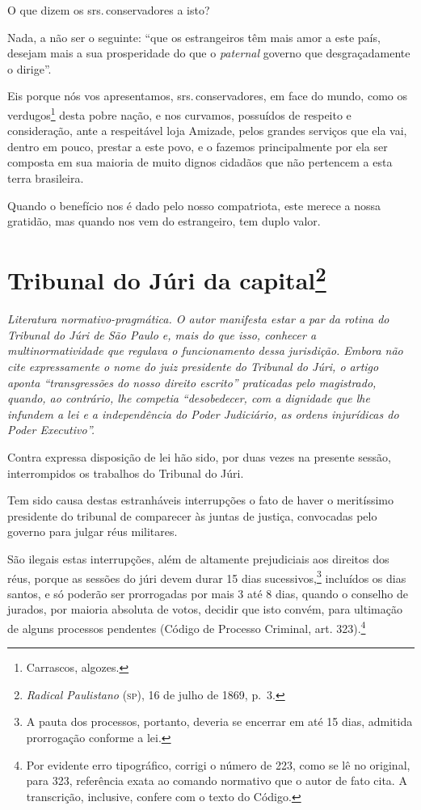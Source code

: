 O que dizem os srs.\,conservadores a isto?

Nada, a não ser o seguinte: ``que os estrangeiros têm mais amor a este
país, desejam mais a sua prosperidade do que o \emph{paternal} governo
que desgraçadamente o dirige''.

Eis porque nós vos apresentamos, srs.\,conservadores, em face do mundo,
como os verdugos\footnote{Carrascos, algozes.} desta pobre nação, e
nos curvamos, possuídos de respeito e consideração, ante a respeitável
loja Amizade, pelos grandes serviços que ela vai, dentro em pouco,
prestar a este povo, e o fazemos principalmente por ela ser composta em
sua maioria de muito dignos cidadãos que não pertencem a esta terra
brasileira.

Quando o benefício nos é dado pelo nosso compatriota, este merece a
nossa gratidão, mas quando nos vem do estrangeiro, tem duplo valor.

\chapter{Tribunal do Júri da capital\footnote{\emph{Radical Paulistano}
  (\textsc{sp}), 16 de julho de 1869, p.~3.}}

\begin{didascalia}\itshape
Literatura normativo-pragmática. O autor manifesta estar a par da rotina
do Tribunal do Júri de São Paulo e, mais do que isso, conhecer a
multinormatividade que regulava o funcionamento dessa jurisdição. Embora
não cite expressamente o nome do juiz presidente do Tribunal do Júri, o
artigo aponta ``transgressões do nosso direito escrito'' praticadas pelo
magistrado, quando, ao contrário, lhe competia ``desobedecer, com a
dignidade que lhe infundem a lei e a independência do Poder Judiciário,
as ordens injurídicas do Poder Executivo''.
\end{didascalia}



Contra expressa disposição de lei hão sido, por duas vezes na presente
sessão, interrompidos os trabalhos do Tribunal do Júri.

Tem sido causa destas estranháveis interrupções o fato de haver o
meritíssimo presidente do tribunal de comparecer às juntas de justiça,
convocadas pelo governo para julgar réus militares.

São ilegais estas interrupções, além de altamente prejudiciais aos
direitos dos réus, porque as sessões do júri devem durar 15 dias
sucessivos,\footnote{A pauta dos processos, portanto, deveria se
  encerrar em até 15 dias, admitida prorrogação conforme a lei.}
incluídos os dias santos, e só poderão ser prorrogadas por mais 3 até 8
dias, quando o conselho de jurados, por maioria absoluta de votos,
decidir que isto convém, para ultimação de alguns processos pendentes
(Código de Processo Criminal, art. 323).\footnote{Por evidente erro
  tipográfico, corrigi o número de 223, como se lê no original, para
  323, referência exata ao comando normativo que o autor de fato cita. A
  transcrição, inclusive, confere com o texto do Código.}

